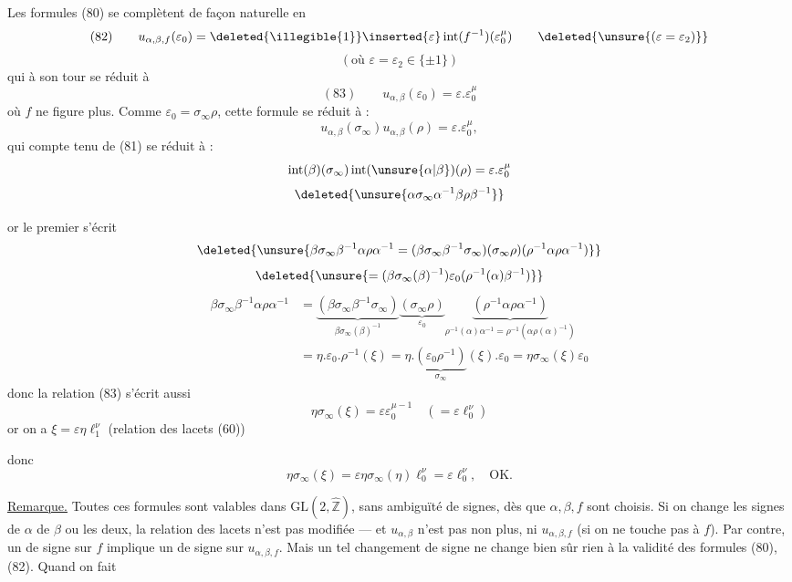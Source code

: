 Les formules (80) se complètent de façon naturelle en
\[
(82)\qquad
u_{\alpha,\beta,f}(\varepsilon_0)
=\deleted{\illegible{1}}\inserted{\varepsilon}\operatorname{int}(f^{-1})(\varepsilon_0^\mu)
\qquad\deleted{\unsure{(\varepsilon=\varepsilon_2)}}
\]
\[
(\text{où }\varepsilon=\varepsilon_2\in\{\pm1\})
\]
qui à son tour se réduit à
\[
(83)\qquad u_{\alpha,\beta}(\varepsilon_0)=\varepsilon.\varepsilon_0^\mu
\]
où $f$ ne figure plus. Comme $\varepsilon_0=\sigma_\infty\rho$, cette formule se réduit à :
\[
u_{\alpha,\beta}(\sigma_\infty)u_{\alpha,\beta}(\rho)=\varepsilon.\varepsilon_0^\mu,
\]
qui compte tenu de (81) se réduit à :
\[
\operatorname{int}(\beta)(\sigma_\infty)\operatorname{int}(\unsure{\alpha|\beta})(\rho)=\varepsilon.\varepsilon_0^\mu
\]
\[
\deleted{\unsure{\alpha\sigma_\infty\alpha^{-1}\beta\rho\beta^{-1}}}
\]


or le premier  s'écrit
\[
\deleted{\unsure{\beta\sigma_\infty\beta^{-1}\alpha\rho\alpha^{-1}
=(\beta\sigma_\infty\beta^{-1}\sigma_\infty)(\sigma_\infty\rho)(\rho^{-1}\alpha\rho\alpha^{-1})}}
\]
\[
\deleted{\unsure{=(\beta\sigma_\infty(\beta)^{-1})\varepsilon_0(\rho^{-1}(\alpha)\beta^{-1})}}
\]
\[
\begin{aligned}
\beta\sigma_\infty\beta^{-1}\alpha\rho\alpha^{-1}
&=\underbrace{(\beta\sigma_\infty\beta^{-1}\sigma_\infty)}_{\beta\sigma_\infty(\beta)^{-1}}
\underbrace{(\sigma_\infty\rho)}_{\varepsilon_0}
\underbrace{(\rho^{-1}\alpha\rho\alpha^{-1})}_{\rho^{-1}(\alpha)\alpha^{-1}=\rho^{-1}(\alpha\rho(\alpha)^{-1})}\\
&=\eta.\varepsilon_0.\rho^{-1}(\xi)
=\eta.\underbrace{(\varepsilon_0\rho^{-1})}_{\sigma_\infty}(\xi).\varepsilon_0
=\eta\sigma_\infty(\xi)\varepsilon_0
\end{aligned}
\]
donc la relation (83) s'écrit aussi
\[
\eta\sigma_\infty(\xi)=\varepsilon\varepsilon_0^{\mu-1}\quad(=\varepsilon \ell_0^\nu)
\]
or on a $\xi=\varepsilon\eta \ell_1^\nu$ (relation des lacets (60))

donc
\[
\eta\sigma_\infty(\xi)=\varepsilon\eta\sigma_\infty(\eta)\ell_0^\nu=\varepsilon \ell_0^\nu,\quad\text{OK.}
\]

\uline{Remarque.} Toutes ces formules sont valables dans $\mathrm{GL}(2,\widehat{\mathbb Z})$, sans ambiguïté de signes, dès que $\alpha,\beta,f$ sont choisis. Si on change les signes de $\alpha$  de $\beta$ ou les deux, la relation des lacets n'est pas modifiée --- et $u_{\alpha,\beta}$ n'est pas  non plus,  ni $u_{\alpha,\beta,f}$ (si on ne touche pas à $f$). Par contre, un  de signe sur $f$ implique un  de signe sur $u_{\alpha,\beta,f}$. Mais un tel changement de signe ne change bien sûr rien à la validité des formules (80), (82). Quand on fait

